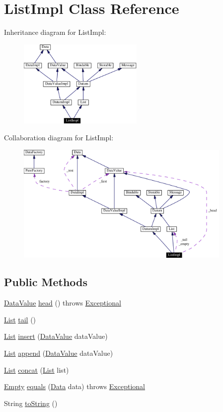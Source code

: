 \hypertarget{classListImpl}{
\section{List\-Impl  Class Reference}
\label{classListImpl}
}
Inheritance diagram for List\-Impl:\begin{figure}[H]
\begin{center}
\leavevmode
\includegraphics[width=170pt]{classListImpl__inherit__graph}
\end{center}
\end{figure}
Collaboration diagram for List\-Impl:\begin{figure}[H]
\begin{center}
\leavevmode
\includegraphics[width=295pt]{classListImpl__coll__graph}
\end{center}
\end{figure}
\subsection*{Public Methods}
\begin{CompactItemize}
\item 
\hyperlink{interfaceDataValue}{Data\-Value} \hyperlink{classListImpl_a0}{head} () throws \hyperlink{classExceptional}{Exceptional}
\item 
\hyperlink{interfaceList}{List} \hyperlink{classListImpl_a1}{tail} ()
\item 
\hyperlink{interfaceList}{List} \hyperlink{classListImpl_a2}{insert} (\hyperlink{interfaceDataValue}{Data\-Value} data\-Value)
\item 
\hyperlink{interfaceList}{List} \hyperlink{classListImpl_a3}{append} (\hyperlink{interfaceDataValue}{Data\-Value} data\-Value)
\item 
\hyperlink{interfaceList}{List} \hyperlink{classListImpl_a4}{concat} (\hyperlink{interfaceList}{List} list)
\item 
\hyperlink{interfaceEmpty}{Empty} \hyperlink{classListImpl_a5}{equals} (\hyperlink{interfaceData}{Data} data) throws \hyperlink{classExceptional}{Exceptional}
\item 
String \hyperlink{classListImpl_a6}{to\-String} ()
\end{CompactItemize}


